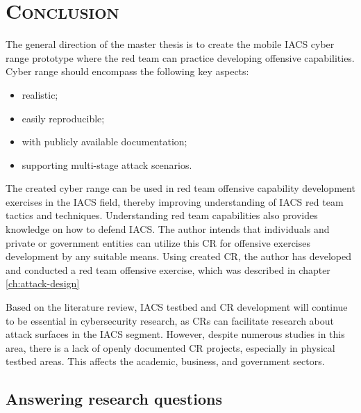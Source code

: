 \chapter{\textsc{Conclusion}} \label{ch:conclusion}

The general direction of the master thesis is to create the mobile IACS cyber range prototype where the red team can practice developing offensive capabilities. Cyber range should encompass the following key aspects:

\begin{itemize}
	\item realistic;
	\item easily reproducible;
	\item with publicly available documentation;
	\item supporting multi-stage attack scenarios.
\end{itemize}

The created cyber range can be used in red team offensive capability development exercises in the IACS field, thereby improving understanding of IACS red team tactics and techniques. Understanding red team capabilities also provides knowledge on how to defend IACS. The author intends that individuals and private or government entities can utilize this CR for offensive exercises development by any suitable means. Using created CR, the author has developed and conducted a red team offensive exercise, which was described in chapter \ref{ch:attack-design}


Based on the literature review, IACS testbed and CR development will continue to be essential in cybersecurity research, as CRs can facilitate research about attack surfaces in the IACS segment. However, despite numerous studies in this area, there is a lack of openly documented CR projects, especially in physical testbed areas. This affects the academic, business, and government sectors.  

\section{Answering research questions}

